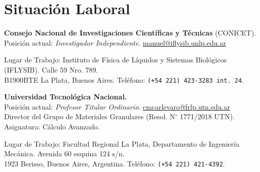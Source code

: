 \section*{Situación Laboral}

 \textbf{Consejo Nacional de Investigaciones Científicas y Técnicas} (CONICET). \\Posición actual: \textit{Investigador Independiente}. \faEnvelopeO{} \href{mailto:manuel@iflysib.unlp.edu.ar}{manuel@iflysib.unlp.edu.ar}

  Lugar de Trabajo: Instituto de Física de Líquidos y Sistemas Biológicos (IFLYSIB). Calle 59 Nro. 789.\\ B1900BTE  La Plata, Buenos Aires. Teléfono: \texttt{(+54 221) 423-3283 int. 24}.

   \textbf{Universidad Tecnológica Nacional.} \\Posición actual: \textit{Profesor Titular Ordinario}. \faEnvelopeO{} \href{mailto:manuel@iflysib.unlp.edu.ar}{cmcarlevaro@frlp.utn.edu.ar} \\
Director del Grupo de Materiales Granulares (Resol. N$^\circ$ 1771/2018 UTN).\\
Asignatura: Cálculo Avanzado.

Lugar de Trabajo: Facultad Regional La Plata, Departamento de Ingeniería Mecánica. Avenida 60 esquina 124 s/n. \\1923 Berisso, Buenos Aires, Argentina. Teléfono: \texttt{(+54 221) 421-4392}.

  
% 
